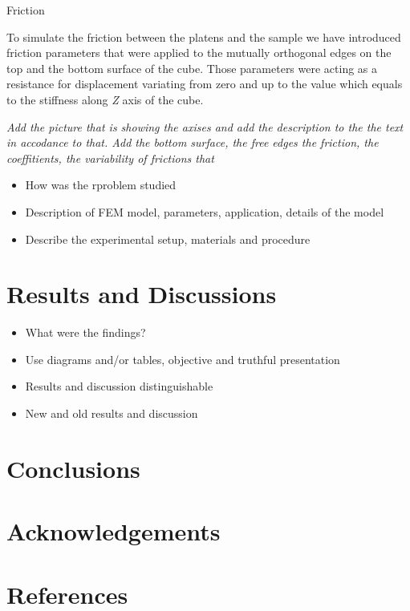 \documentclass[review]{elsarticle}
\begin{document}
\begin{description}
\item[{\color {red}Friction}]
\end{description}

To simulate the friction between the platens and the sample we have
introduced friction parameters that were applied to the mutually orthogonal
edges on the top and the bottom surface of the cube. Those parameters were
acting as a resistance for displacement variating from zero and up to the value
which equals to the stiffness along \textit{Z} axis of the cube.


\textit{{\color {red}Add the picture that is showing the axises and add the
description to the the text in accodance to that. Add the bottom surface, the
free edges the friction, the coeffitients, the variability of frictions that }}
\begin{itemize}
\color{red}

\item How was the rproblem studied 
\item Description of FEM model, parameters, application, details of the model
\item Describe the experimental setup, materials and procedure
\end{itemize}


\section{Results and Discussions}
\begin{itemize}
\color{red}
\item What were the findings?
\item Use diagrams and/or tables, objective and truthful presentation
\item Results and discussion distinguishable
\item New and old results and discussion
\end{itemize}


\section{Conclusions}

\section*{Acknowledgements}

\section*{References}


\end{document}

